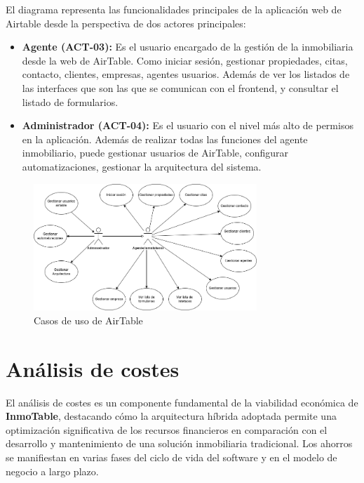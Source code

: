 El diagrama representa las funcionalidades principales de la aplicación web de Airtable desde la perspectiva de dos actores principales:

\begin{itemize}
    \item \textbf{Agente (ACT-03):} Es el usuario encargado de la gestión de la inmobiliaria desde la web de AirTable. Como iniciar sesión, gestionar propiedades, citas, contacto, clientes, empresas, agentes usuarios. Además de ver los listados de las interfaces que son las que se comunican con el frontend, y consultar el listado de formularios.

    \item \textbf{Administrador (ACT-04):} Es el usuario con el nivel más alto de permisos en la aplicación. Además de realizar todas las funciones del agente inmobiliario, puede gestionar usuarios de AirTable, configurar automatizaciones, gestionar la arquitectura del sistema.
\end{itemize}

\begin{figure}[H]
    \begin{center}
        \includegraphics[width = 0.75\textwidth]{Figuras/diagrama_casos_de_uso_airtable.png}
    \end{center}
    \caption{\label{fig:diagrama_casos_de_uso_airtable} Casos de uso de AirTable}
\end{figure}


\section{Análisis de costes}


El análisis de costes es un componente fundamental de la viabilidad económica de \textbf{InmoTable}, destacando cómo la arquitectura híbrida adoptada permite una optimización significativa de los recursos financieros en comparación con el desarrollo y mantenimiento de una solución inmobiliaria tradicional. Los ahorros se manifiestan en varias fases del ciclo de vida del software y en el modelo de negocio a largo plazo.

